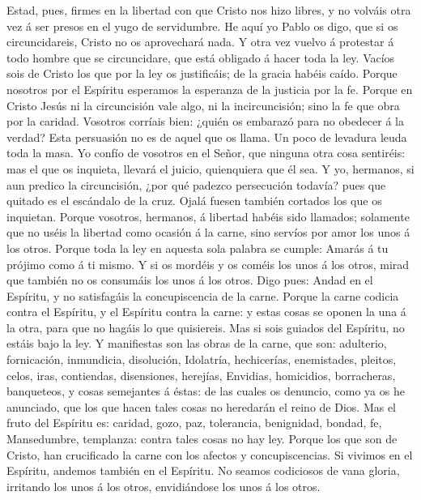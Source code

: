  Estad, pues, firmes en la libertad con que Cristo nos
hizo libres, y no volváis otra vez á ser presos en el yugo de
servidumbre.  He aquí yo Pablo os digo, que si os
circuncidareis, Cristo no os aprovechará nada.  Y otra vez
vuelvo á protestar á todo hombre que se circuncidare, que está obligado
á hacer toda la ley.  Vacíos sois de Cristo los que por la
ley os justificáis; de la gracia habéis caído.  Porque
nosotros por el Espíritu esperamos la esperanza de la justicia por la
fe.  Porque en Cristo Jesús ni la circuncisión vale algo,
ni la incircuncisión; sino la fe que obra por la caridad. 
Vosotros corríais bien: ¿quién os embarazó para no obedecer á la verdad?
 Esta persuasión no es de aquel que os llama.
 Un poco de levadura leuda toda la masa. 
Yo confío de vosotros en el Señor, que ninguna otra cosa sentiréis: mas
el que os inquieta, llevará el juicio, quienquiera que él sea.
 Y yo, hermanos, si aun predico la circuncisión, ¿por qué
padezco persecución todavía? pues que quitado es el escándalo de la
cruz.  Ojalá fuesen también cortados los que os
inquietan.  Porque vosotros, hermanos, á libertad habéis
sido llamados; solamente que no uséis la libertad como ocasión á la
carne, sino servíos por amor los unos á los otros. 
Porque toda la ley en aquesta sola palabra se cumple: Amarás á tu
prójimo como á ti mismo.  Y si os mordéis y os coméis los
unos á los otros, mirad que también no os consumáis los unos á los
otros.  Digo pues: Andad en el Espíritu, y no satisfagáis
la concupiscencia de la carne.  Porque la carne codicia
contra el Espíritu, y el Espíritu contra la carne: y estas cosas se
oponen la una á la otra, para que no hagáis lo que quisiereis.
 Mas si sois guiados del Espíritu, no estáis bajo la ley.
 Y manifiestas son las obras de la carne, que son:
adulterio, fornicación, inmundicia, disolución, 
Idolatría, hechicerías, enemistades, pleitos, celos, iras, contiendas,
disensiones, herejías,  Envidias, homicidios,
borracheras, banqueteos, y cosas semejantes á éstas: de las cuales os
denuncio, como ya os he anunciado, que los que hacen tales cosas no
heredarán el reino de Dios.  Mas el fruto del Espíritu
es: caridad, gozo, paz, tolerancia, benignidad, bondad, fe,
 Mansedumbre, templanza: contra tales cosas no hay ley.
 Porque los que son de Cristo, han crucificado la carne
con los afectos y concupiscencias.  Si vivimos en el
Espíritu, andemos también en el Espíritu.  No seamos
codiciosos de vana gloria, irritando los unos á los otros, envidiándose
los unos á los otros.

